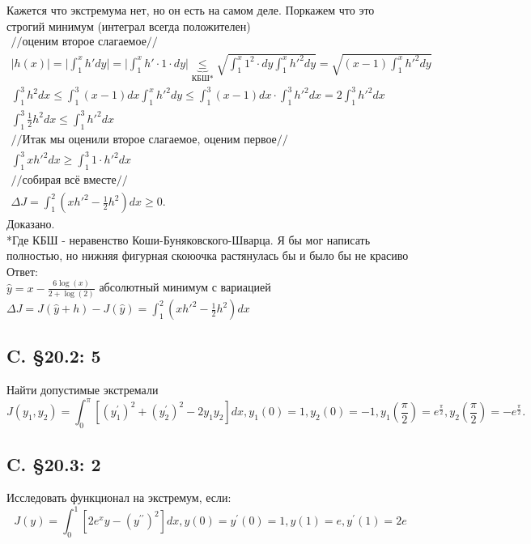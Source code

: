 \documentclass{article}
\begin{document}
 Кажется что экстремума нет, но он есть на самом деле. Поркажем что это строгий минимум (интеграл всегда положителен)
 \begin{gather*}
    //\text{оценим второе слагаемое}//\\
     |h(x)| = \bigg|\int_1^x h' dy \bigg| = \bigg|\int_1^x h' \cdot 1 \cdot dy \bigg| \underbrace{\leq}_{\text{КБШ*}} \sqrt{\int_1^x 1^2 \cdot dy \int_1^xh'^2 dy  } = \sqrt{(x-1) \int_1^xh'^2 dy }\\
     \int_1^3 h^2 dx \leq \int_1^3 (x-1) dx \int_1^x h'^2 dy  \leq \int_1^3 (x-1)dx \cdot \int_1^3 h'^2 dx = 2 \int_1^3 h'^2 dx\\
     \int_1^3 \frac{1}{2}h^2 dx \leq \int_1^3 h'^2 dx\\ 
     //\text{Итак мы оценили второе слагаемое, оценим первое}//\\
     \int_1^3 x h'^2 dx \geq \int_1^3 1\cdot h'^2 dx\\
     //\text{собирая всё вместе}//\\
     \Delta J = \int_1^2 \left(x h'^2 - \frac{1}{2} h^2 \right)dx \geq 0.
 \end{gather*}
 Доказано.\\
*Где КБШ  - неравенство Коши-Буняковского-Шварца. Я бы мог написать полностью, но нижняя фигурная скоюочка растянулась бы и было бы не красиво\\
Ответ: \\
$\hat y = x-\frac{6 \log (x)}{2+\log (2)}$  абсолютный минимум с вариацией $\Delta J = J(\hat y + h) - J(\hat y) =\int_1^2 \left(x h'^2 - \frac{1}{2} h^2 \right)dx$ 

\subsection{C. \S20.2: 5}
Найти допустимые экстремали
\begin{equation}
J\left(y_{1}, y_{2}\right)=\int_{0}^{\pi}\left[\left(y_{1}^{\prime}\right)^{2}+\left(y_{2}^{\prime}\right)^{2}-2 y_{1} y_{2}\right] d x, y_{1}(0)=1, y_{2}(0)=-1, y_{1}\left(\frac{\pi}{2}\right)=e^{\frac{\pi}{2}}, y_{2}\left(\frac{\pi}{2}\right)=-e^{\frac{\pi}{2}} .
\end{equation}


\subsection{C. \S20.3: 2}
Исследовать функционал на экстремум, если:
\begin{equation}
J(y)=\int_{0}^{1}\left[2 e^{x} y-\left(y^{\prime \prime}\right)^{2}\right] d x, y(0)=y^{\prime}(0)=1, y(1)=e, y^{\prime}(1)=2 e
\end{equation}
\end{document}
